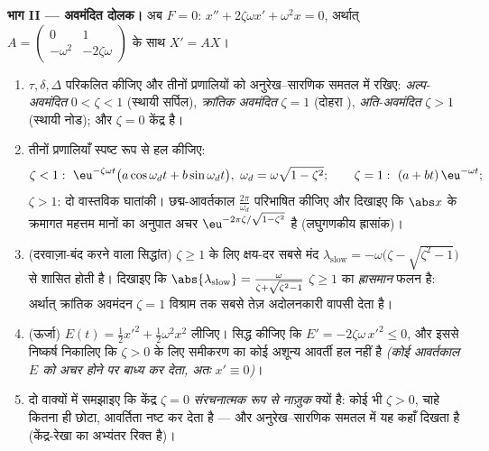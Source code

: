 \begin{problem}
\medskip
\noindent\textbf{भाग II --- अवमंदित दोलक।} अब $F =
0$: $x'' + 2\zeta\omega x' + \omega^2x = 0$, अर्थात् $A = \begin{pmatrix} 0 & 1\\ -\omega^2 &
-2\zeta\omega\end{pmatrix}$ के
साथ $X' = AX$।
\begin{enumerate}[resume]
  \item $\tau, \delta, \Delta$ परिकलित कीजिए और तीनों प्रणालियों को अनुरेख--सारणिक समतल में
        रखिए: \emph{अल्प-अवमंदित} $0 < \zeta < 1$ (स्थायी सर्पिल), \emph{क्रांतिक
        अवमंदित} $\zeta = 1$ (दोहरा ), \emph{अति-अवमंदित} $\zeta > 1$
        (स्थायी नोड); और $\zeta = 0$ केंद्र है।
  \item तीनों प्रणालियाँ स्पष्ट रूप से हल कीजिए:
        \[
        \zeta < 1:\ \eu^{-\zeta\omega t}\bigl(a\cos\omega_d t
        + b\sin\omega_dt\bigr),\ \omega_d =
        \omega\sqrt{1-\zeta^2};
        \qquad
        \zeta = 1:\ (a + bt)\,\eu^{-\omega t};
        \]
        $\zeta > 1$: दो वास्तविक घातांकी। छद्म-आवर्तकाल $\frac{2\pi}{\omega_d}$ परिभाषित कीजिए और
        दिखाइए कि $\abs x$ के क्रमागत महत्तम मानों का अनुपात अचर $\eu^{-2\pi\zeta/\sqrt{1-\zeta^2}}$ है
        (लघुगणकीय ह्रासांक)।
  \item (दरवाज़ा-बंद करने वाला सिद्धांत) $\zeta \geq 1$ के लिए क्षय-दर सबसे मंद
         $\lambda_{\mathrm{slow}} = -\omega\bigl(\zeta -
        \sqrt{\zeta^2-1}\bigr)$ से शासित होती है। दिखाइए कि $\abs{\lambda_{\mathrm{slow}}} =
        \frac{\omega}{\zeta + \sqrt{\zeta^2 - 1}}$ $\zeta \geq 1$ का
        \emph{ह्रासमान} फलन है: अर्थात् क्रांतिक अवमंदन $\zeta = 1$ विश्राम तक
        सबसे तेज़ अदोलनकारी वापसी देता है।
  \item (ऊर्जा) $E(t) = \frac12x'^2 +
        \frac12\omega^2x^2$ लीजिए। सिद्ध कीजिए कि $E' = -2\zeta\omega\,x'^2
        \leq 0$, और इससे निष्कर्ष
        निकालिए कि $\zeta > 0$ के लिए समीकरण का कोई अशून्य आवर्ती हल नहीं है
        \emph{(कोई आवर्तकाल $E$ को अचर होने पर बाध्य कर देता, अतः $x' \equiv 0$)}।
  \item दो वाक्यों में समझाइए कि केंद्र $\zeta = 0$ \emph{संरचनात्मक रूप से
        नाज़ुक} क्यों है: कोई भी $\zeta > 0$, चाहे कितना ही छोटा, आवर्तिता नष्ट
        कर देता है --- और अनुरेख--सारणिक समतल में यह कहाँ दिखता है
        (केंद्र-रेखा का अभ्यंतर रिक्त है)।
\end{enumerate}


\end{problem}
